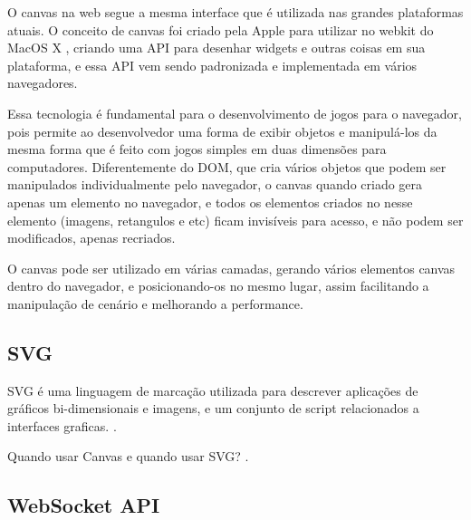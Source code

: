 O canvas na web segue a mesma interface que é utilizada nas grandes
plataformas atuais. O conceito de canvas foi criado pela Apple para
utilizar no webkit do MacOS X \cite{lubbers2010pro}, criando uma API
para desenhar widgets e outras coisas em sua plataforma, e essa API
vem sendo padronizada e implementada em vários navegadores.

Essa tecnologia é fundamental para o desenvolvimento de jogos para
o navegador, pois permite ao desenvolvedor uma forma de exibir
objetos e manipulá-los da mesma forma que é feito com jogos
simples em duas dimensões para computadores.
Diferentemente do DOM, que cria vários objetos que podem ser
manipulados individualmente pelo navegador, o canvas quando criado
gera apenas um elemento no navegador, e todos os elementos criados
no nesse elemento (imagens, retangulos e etc) ficam invisíveis para acesso, e
não podem ser modificados, apenas recriados.

O canvas pode ser utilizado em várias camadas, gerando vários
elementos canvas dentro do navegador, e posicionando-os no mesmo
lugar, assim facilitando a manipulação de cenário e melhorando a
performance.


%
%

\clearpage

\subsection{SVG}
SVG é uma linguagem de marcação utilizada para descrever aplicações de gráficos
bi-dimensionais e imagens, e um conjunto de script relacionados a
interfaces graficas. \cite{w3csvg}.

Quando usar Canvas e quando usar SVG?
\cite{svgtimetrap}.

\subsection{WebSocket API}

